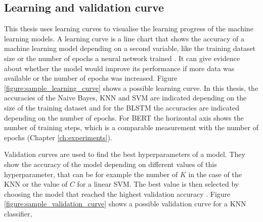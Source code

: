 \subsection{Learning and validation curve}
\label{subsec:learning_validation_curve}
This thesis uses learning curves to visualise the learning progress of the machine learning models.
A learning curve is a line chart that shows the accuracy of a machine learning model depending on a second variable, like the training dataset size or the number of epochs a neural network trained \cite[pp. 702-703]{Russel2016}.
It can give evidence about whether the model would improve its performance if more data was available or the number of epochs was increased.
Figure \ref{figure:sample_learning_curve} shows a possible learning curve.
In this thesis, the accuracies of the Naive Bayes, \ac{KNN} and \ac{SVM} are indicated depending on the size of the training dataset and for the \ac{BLSTM} the accuracies are indicated depending on the number of epochs.
For \ac{BERT} the horizontal axis shows the number of training steps, which is a comparable measurement with the number of epochs (Chapter \ref{ch:experiments}).

Validation curves are used to find the best hyperparameters of a model.
They show the accuracy of the model depending on different values of this hyperparameter, that can be for example the number of $K$ in the case of the \ac{KNN} or the value of $C$ for a linear \ac{SVM}.
The best value is then selected by choosing the model that reached the highest validation accuracy \cite[p. 711]{Russel2016}.
Figure \ref{figure:sample_validation_curve} shows a possible validation curve for a \ac{KNN} classifier, 

